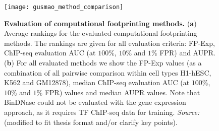 \begin{figure}[h!]
\centering
\texttt{[image: gusmao\_method\_comparison]}
\caption[Evaluation of computational footprinting methods]{\textbf{Evaluation of computational footprinting methods.} (\textbf{a}) Average rankings for the evaluated computational footprinting methods. The rankings are given for all evaluation criteria: FP-Exp, ChIP-seq evaluation AUC (at $100\%$, $10\%$ and $1\%$ FPR) and AUPR. (\textbf{b}) For all evaluated methods we show the FP-Exp values (as a combination of all pairwise comparison within cell types H1-hESC, K562 and GM12878), median ChIP-seq evaluation AUC (at $100\%$, $10\%$ and $1\%$ FPR) values and median AUPR values. Note that BinDNase could not be evaluated with the gene expression approach, as it requires TF ChIP-seq data for training. \emph{Source:~\cite{gusmao2016}} (modified to fit thesis format and/or clarify key points).}
\label{fig:gusmao_method_comparison}
\end{figure}


